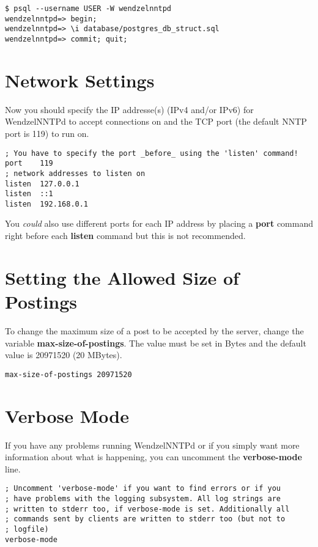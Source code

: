 \begin{verbatim}
$ psql --username USER -W wendzelnntpd
wendzelnntpd=> begin;
wendzelnntpd=> \i database/postgres_db_struct.sql
wendzelnntpd=> commit; quit;
\end{verbatim}

\section{Network Settings}

Now you should specify the IP addresse(s) (IPv4 and/or IPv6) for WendzelNNTPd to accept connections on and the TCP port (the default NNTP port is 119) to run on.

\begin{verbatim}
; You have to specify the port _before_ using the 'listen' command!
port	119
; network addresses to listen on
listen	127.0.0.1
listen	::1
listen	192.168.0.1
\end{verbatim}

You \textit{could} also use different ports for each IP address by placing a \textbf{port} command right before each \textbf{listen} command but this is not recommended.

\section{Setting the Allowed Size of Postings}

To change the maximum size of a post to be accepted by the server, change the variable \textbf{max-size-of-postings}. The value must be set in Bytes and the default value is 20971520 (20 MBytes).

\begin{verbatim}
max-size-of-postings 20971520
\end{verbatim}

\section{Verbose Mode}

If you have any problems running WendzelNNTPd or if you simply want more information about what is happening, you can uncomment the \textbf{verbose-mode} line.

\begin{verbatim}
; Uncomment 'verbose-mode' if you want to find errors or if you
; have problems with the logging subsystem. All log strings are
; written to stderr too, if verbose-mode is set. Additionally all
; commands sent by clients are written to stderr too (but not to
; logfile)
verbose-mode
\end{verbatim}

